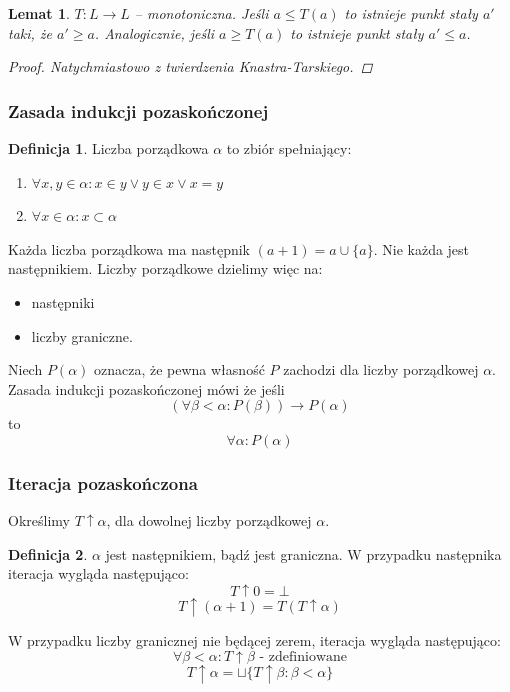 \documentclass[10pt,a4paper]{article}
\theoremstyle{plain}
\newtheorem{lemma}{Lemat}
\theoremstyle{definition}
\newtheorem*{definition}{Definicja}
\newcommand{\impl}{\rightarrow}
\begin{document}
\begin{lemma}
$T: L \to L$ -- monotoniczna. Jeśli $a \leq T(a)$ to istnieje punkt stały 
$a'$ taki, że $a' \geq a$. Analogicznie, jeśli $a \geq T(a)$ to istnieje punkt 
stały $a' \leq a$.
\begin{proof}
 Natychmiastowo z twierdzenia Knastra-Tarskiego.
\end{proof}
\end{lemma}

\subsubsection{Zasada indukcji pozaskończonej}
\begin{definition}
 Liczba porządkowa $\alpha$ to zbiór spełniający: 
 \begin{enumerate}
  \item $\forall x,y \in \alpha : x \in y \lor y \in x \lor x = y$
  \item $\forall x \in \alpha : x \subset \alpha$
 \end{enumerate}
\end{definition}

Każda liczba porządkowa ma następnik $(a+1) = a \cup \lbrace a \rbrace$. 
Nie każda jest następnikiem. Liczby porządkowe dzielimy więc na:
\begin{itemize}
 \item następniki 
 \item liczby graniczne.
\end{itemize}


Niech $P(\alpha)$ oznacza, że pewna własność $P$ zachodzi dla liczby 
porządkowej $\alpha$. \\
Zasada indukcji pozaskończonej mówi że jeśli 
$$(\forall \beta < \alpha : P(\beta)) \impl P(\alpha)$$ to 
$$\forall \alpha : P(\alpha)$$


\subsubsection{Iteracja pozaskończona}

Określimy $T \uparrow \alpha$, dla dowolnej liczby porządkowej $\alpha$.
\begin{definition}
$\alpha$ jest następnikiem, bądź jest graniczna. W przypadku następnika iteracja wygląda następująco:
\[ T \uparrow 0 = \bot \]
\[ T \uparrow (\alpha + 1) = T(T \uparrow \alpha) \]
\end{definition}
W przypadku liczby granicznej nie będącej zerem, iteracja wygląda następująco:
\[ \forall \beta < \alpha : T \uparrow \beta \text{ - zdefiniowane} \]
\[ T \uparrow \alpha = \sqcup \lbrace T \uparrow \beta : \beta < \alpha \rbrace \]
\end{document}
